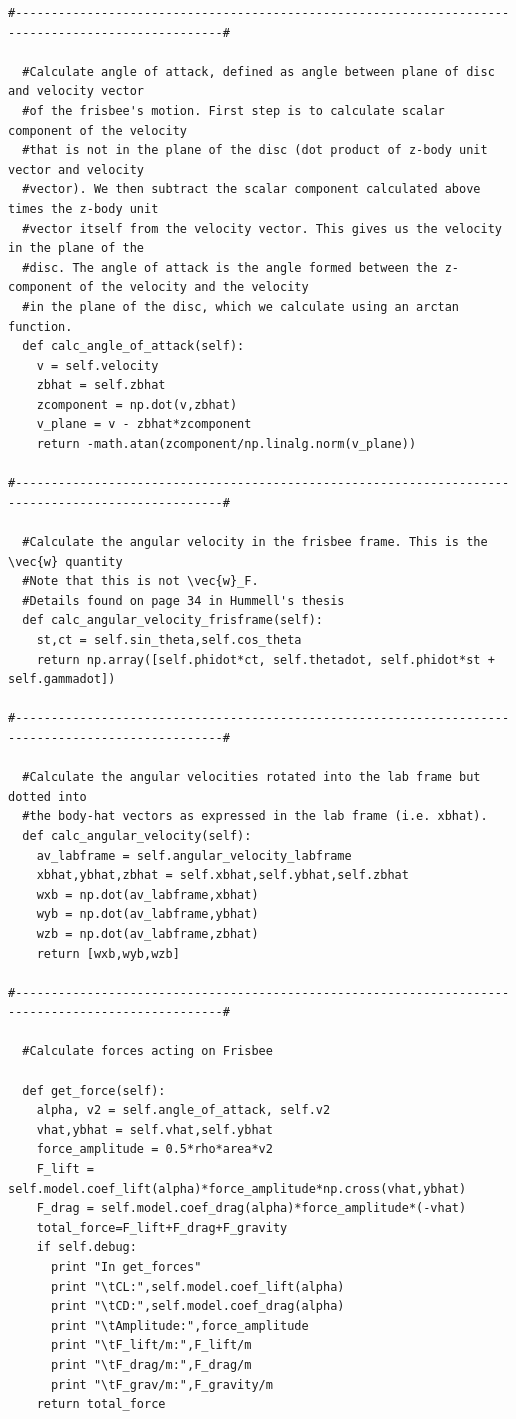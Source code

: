 \documentclass[a4paper,12pt, oneside]{article}
\begin{document}
\begin{verbatim}
#---------------------------------------------------------------------------------------------------#

  #Calculate angle of attack, defined as angle between plane of disc and velocity vector
  #of the frisbee's motion. First step is to calculate scalar component of the velocity 
  #that is not in the plane of the disc (dot product of z-body unit vector and velocity
  #vector). We then subtract the scalar component calculated above times the z-body unit
  #vector itself from the velocity vector. This gives us the velocity in the plane of the
  #disc. The angle of attack is the angle formed between the z-component of the velocity and the velocity
  #in the plane of the disc, which we calculate using an arctan function.
  def calc_angle_of_attack(self):
    v = self.velocity
    zbhat = self.zbhat
    zcomponent = np.dot(v,zbhat)
    v_plane = v - zbhat*zcomponent
    return -math.atan(zcomponent/np.linalg.norm(v_plane))

#---------------------------------------------------------------------------------------------------#

  #Calculate the angular velocity in the frisbee frame. This is the \vec{w} quantity
  #Note that this is not \vec{w}_F.
  #Details found on page 34 in Hummell's thesis
  def calc_angular_velocity_frisframe(self):
    st,ct = self.sin_theta,self.cos_theta
    return np.array([self.phidot*ct, self.thetadot, self.phidot*st + self.gammadot])

#---------------------------------------------------------------------------------------------------#

  #Calculate the angular velocities rotated into the lab frame but dotted into
  #the body-hat vectors as expressed in the lab frame (i.e. xbhat).
  def calc_angular_velocity(self):
    av_labframe = self.angular_velocity_labframe
    xbhat,ybhat,zbhat = self.xbhat,self.ybhat,self.zbhat
    wxb = np.dot(av_labframe,xbhat)
    wyb = np.dot(av_labframe,ybhat)
    wzb = np.dot(av_labframe,zbhat)
    return [wxb,wyb,wzb]

#---------------------------------------------------------------------------------------------------#

  #Calculate forces acting on Frisbee

  def get_force(self):
    alpha, v2 = self.angle_of_attack, self.v2
    vhat,ybhat = self.vhat,self.ybhat
    force_amplitude = 0.5*rho*area*v2
    F_lift = self.model.coef_lift(alpha)*force_amplitude*np.cross(vhat,ybhat)
    F_drag = self.model.coef_drag(alpha)*force_amplitude*(-vhat)
    total_force=F_lift+F_drag+F_gravity
    if self.debug:
      print "In get_forces"
      print "\tCL:",self.model.coef_lift(alpha)
      print "\tCD:",self.model.coef_drag(alpha)
      print "\tAmplitude:",force_amplitude
      print "\tF_lift/m:",F_lift/m
      print "\tF_drag/m:",F_drag/m
      print "\tF_grav/m:",F_gravity/m
    return total_force


\end{verbatim}
\end{document}

